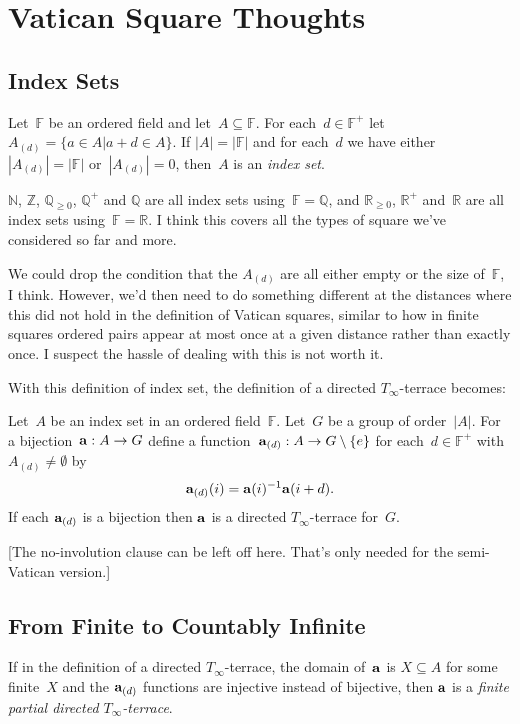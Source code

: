 \documentclass[a4paper,12pt]{article}
\newcommand{\Z}{\mathbb{Z}}
\newcommand{\F}{\mathbb{F}}
\newcommand{\R}{\mathbb{R}}
\newcommand{\Q}{\mathbb{Q}}
\newcommand{\N}{\mathbb{N}}
\begin{document}
\section{Vatican Square Thoughts}

\subsection{Index Sets}

Let~$\F$ be an ordered field and let~$A \subseteq \F$.   For each~$d \in \F^+$ let~$A_{(d)} = \{ a \in A | a+d \in A \}$.  If $|A| = |\F|$ and for each~$d$ we have either $|A_{(d)}| = |\F|$ or~$|A_{(d)}| = 0$, then~$A$ is an {\em index set}.  

$\N$, $\Z$, $\Q_{\geq 0}$, $\Q^+$ and $\Q$ are all index sets using~$\F = \Q$,  and $\R_{\geq 0}$, $\R^+$ and~$\R$ are all index sets using~$\F = \R$.  I think this covers all the types of square we've considered so far and more. 

We could drop the condition that the $A_{(d)}$ are all either empty or the size of~$\F$, I think.  However, we'd then need to do something different at the distances where this did not hold in the definition of Vatican squares, similar to how in finite squares ordered pairs appear at most once at a given distance rather than exactly once.  I suspect the hassle of dealing with this is not worth it.

With this definition of index set, the definition of a directed $T_{\infty}$-terrace becomes:

Let~$A$ be an index set in an ordered field~$\F$.  Let~$G$ be a group of order~$|A|$.  For a bijection~${\bf a}: A \rightarrow G$ define a function~${\bf a}_{(d)}: A \rightarrow G \setminus \{ e \}$ for each~$d \in \F^+$ with~$A_{(d)} \neq \emptyset$ by
$${\bf a}_{(d)}(i) = {\bf a}(i)^{-1}{\bf a}(i+d).$$
If each ${\bf a}_{(d)}$ is a bijection then ${\bf a}$ is  a directed $T_{\infty}$-terrace for~$G$.

[The no-involution clause can be left off here. That's only needed for the semi-Vatican version.]


\subsection{From Finite to Countably Infinite}

If in the definition of a directed $T_{\infty}$-terrace, the domain of~${\bf a}$ is $X \subseteq A$ for some finite~$X$ and the ${\bf a}_{(d)}$ functions are injective instead of bijective, then ${\bf a}$ is a {\em finite partial directed $T_{\infty}$-terrace}.
\end{document}
